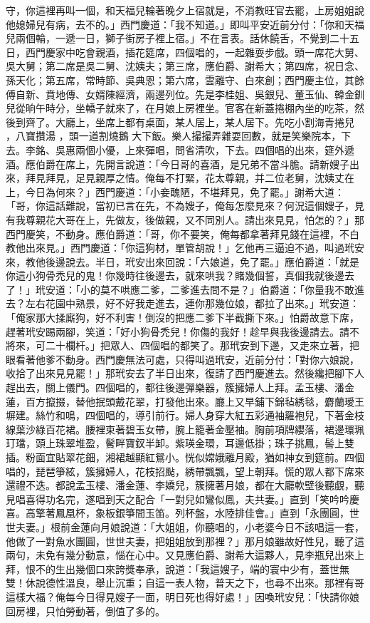 守，你這裡再叫一個，和天福兒輪著晚夕上宿就是，不消教旺官去罷，上房姐姐說他媳婦兒有病，去不的。」西門慶道：「我不知道。」即叫平安近前分付：「你和天福兒兩個輪，一遞一日，獅子街房子裡上宿。」不在言表。話休饒舌，不覺到二十五日，西門慶家中吃會親酒，插花筵席，四個唱的，一起雜耍步戲。頭一席花大舅、吳大舅；第二席是吳二舅、沈姨夫；第三席，應伯爵、謝希大；第四席，祝日念、孫天化；第五席，常時節、吳典恩；第六席，雲離守、白來創；西門慶主位，其餘傅自新、賁地傳、女婿陳經濟，兩邊列位。先是李桂姐、吳銀兒、董玉仙、韓金釧兒從晌午時分，坐轎子就來了，在月娘上房裡坐。官客在新蓋捲棚內坐的吃茶，然後到齊了。大廳上，坐席上都有桌面，某人居上，某人居下。先吃小割海青捲兒 ，八寶攢湯 ，頭一道割燒鵝 大下飯。樂人撮撮弄雜耍回數，就是笑樂院本，下去。李銘、吳惠兩個小優，上來彈唱，問省清吹，下去。四個唱的出來，筵外遞酒。應伯爵在席上，先開言說道：「今日哥的喜酒，是兄弟不當斗膽。請新嫂子出來，拜見拜見，足見親厚之情。俺每不打緊，花太尊親，并二位老舅，沈姨丈在上，今日為何來？」西門慶道：「小妾醜陋，不堪拜見，免了罷。」謝希大道：「哥，你這話難說，當初已言在先，不為嫂子，俺每怎麼見來？何況這個嫂子，見有我尊親花大哥在上，先做友，後做親，又不同別人。請出來見見，怕怎的？」那西門慶笑，不動身。應伯爵道：「哥，你不要笑，俺每都拿著拜見錢在這裡，不白教他出來見。」西門慶道：「你這狗材，單管胡說！」乞他再三逼迫不過，叫過玳安來，教他後邊說去。半日，玳安出來回說：「六娘道，免了罷。」應伯爵道：「就是你這小狗骨禿兒的鬼！你幾時往後邊去，就來哄我？賭幾個誓，真個我就後邊去了！」玳安道：「小的莫不哄應二爹，二爹進去問不是？」伯爵道：「你量我不敢進去？左右花園中熟景，好不好我走進去，連你那幾位娘，都拉了出來。」玳安道：「俺家那大揉廝狗，好不利害！倒沒的把應二爹下半截撕下來。」怕爵故意下席，趕著玳安踢兩腳，笑道：「好小狗骨禿兒！你傷的我好！趁早與我後邊請去。請不將來，可二十欄杆。」把眾人、四個唱的都笑了。那玳安到下邊，又走來立著，把眼看著他爹不動身。西門慶無法可處，只得叫過玳安，近前分付：「對你六娘說，收拾了出來見見罷！」那玳安去了半日出來，復請了西門慶進去。然後纔把腳下人趕出去，關上儀門。四個唱的，都往後邊彈樂器，簇擁婦人上拜。孟玉樓、潘金蓮，百方攛掇，替他抿頭戴花翠，打發他出來。廳上又早鋪下錦毡綉毯，麝蘭璦王塀建。絲竹和鳴，四個唱的，導引前行。婦人身穿大紅五彩通袖羅袍兒，下著金枝線葉沙綠百花裙。腰裡束著碧玉女帶，腕上籠著金壓袖。胸前項牌纓落，裙邊環珮玎璫，頭上珠翠堆盈，鬢畔寶釵半卸。紫瑛金環，耳邊低掛；珠子挑鳳，髻上雙插。粉面宜貼翠花鈿，湘裙越顯紅鴛小。恍似嫦娥離月殿，猶如神女到筵前。四個唱的，琵琶箏絃，簇擁婦人，花枝招颭，綉帶飄飄，望上朝拜。慌的眾人都下席來還禮不迭。都說孟玉樓、潘金蓮、李嬌兒，簇擁著月娘，都在大廳軟壁後聽覷，聽見唱喜得功名完，遂唱到天之配合「一對兒如鸞似鳳，夫共妻。」直到「笑吟吟慶喜。高擎著鳳凰杯，象板銀箏間玉笛。列杯盤，水陸排佳會。」直到「永團圓，世世夫妻。」根前金蓮向月娘說道：「大姐姐，你聽唱的，小老婆今日不該唱這一套，他做了一對魚水團圓，世世夫妻，把姐姐放到那裡？」那月娘雖故好性兒，聽了這兩句，未免有幾分動意，惱在心中。又見應伯爵、謝希大這夥人，見李瓶兒出來上拜，恨不的生出幾個口來誇獎奉承，說道：「我這嫂子，端的寰中少有，蓋世無雙！休說德性溫良，舉止沉重；自這一表人物，普天之下，也尋不出來。那裡有哥這樣大福？俺每今日得見嫂子一面，明日死也得好處！」因喚玳安兒：「快請你娘回房裡，只怕勞動著，倒值了多的。